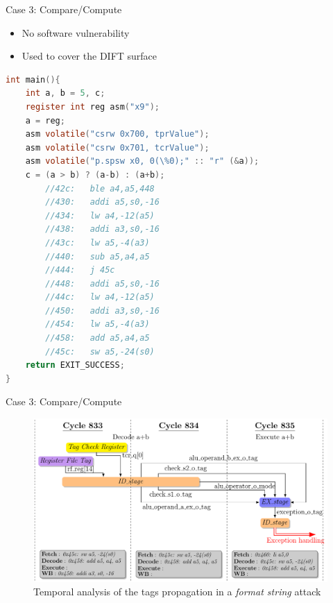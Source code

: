 \begin{frame}{Case 3: Compare/Compute}
    \begin{itemize}
        \justifying
        \item No software vulnerability
        \item Used to cover the DIFT surface
    \end{itemize}

    \centering
    \begin{minipage}[c]{\textwidth}
        \begin{lstlisting}[language=C,label=code:compareCompute]
int main(){
    int a, b = 5, c;
    register int reg asm("x9");
    a = reg;
    asm volatile("csrw 0x700, tprValue");
    asm volatile("csrw 0x701, tcrValue");
    asm volatile("p.spsw x0, 0(\%0);" :: "r" (&a));
    c = (a > b) ? (a-b) : (a+b);
        //42c:   ble a4,a5,448
        //430:   addi a5,s0,-16
        //434:   lw a4,-12(a5)
        //438:   addi a3,s0,-16
        //43c:   lw a5,-4(a3)
        //440:   sub a5,a4,a5
        //444:   j 45c
        //448:   addi a5,s0,-16
        //44c:   lw a4,-12(a5)
        //450:   addi a3,s0,-16
        //454:   lw a5,-4(a3)
        //458:   add a5,a4,a5
        //45c:   sw a5,-24(s0)
    return EXIT_SUCCESS;
}\end{lstlisting}
    \end{minipage}
\end{frame}

\begin{frame}[noframenumbering]{Case 3: Compare/Compute}
    \begin{figure}
        \centering
        \includegraphics[height=.85\textheight]{src/2_vuln_assessment/img/comp_compu/attaquePropag_v3_short.pdf}
        \caption{Temporal analysis of the tags propagation in a \textit{format string} attack}
        \label{fig:analyseTempoCompCompute}
    \end{figure}
\end{frame}

